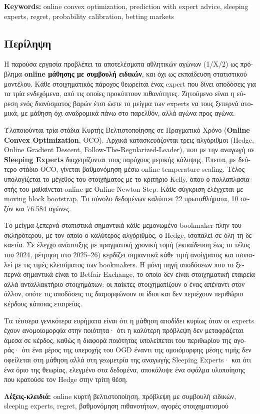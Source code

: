 \documentclass[12pt,a4paper,oneside]{report}
\renewcommand{\_}{\oldunderscore\allowbreak}
\theoremstyle{definition}
\theoremstyle{plain}
\theoremstyle{definition}   %
\begin{document}
\vspace{1em}
\noindent\textbf{Keywords:} online convex optimization, prediction with expert advice,
sleeping experts, regret, probability calibration, betting markets

\cleardoublepage

\begin{greek}
\chapter*{Περίληψη}

Η παρούσα εργασία προβλέπει τα αποτελέσματα αθλητικών αγώνων (1/Χ/2) ως πρόβλημα
\textbf{online μάθησης με συμβουλή ειδικών}, και όχι ως εκπαίδευση στατιστικού μοντέλου.
Κάθε στοιχηματικός πάροχος θεωρείται ένας expert που δίνει αποδόσεις για τα τρία ενδεχόμενα,
από τις οποίες προκύπτουν πιθανότητες. Ζητούμενο είναι η εύρεση ενός διανύσματος βαρών έτσι
ώστε το μείγμα των experts να τους ξεπερνά ατομικά, με μάθηση όχι αναδρομικά πάνω στο
παρελθόν, αλλά αγώνα προς αγώνα.

Υλοποιούνται τρία στάδια Κυρτής Βελτιστοποίησης σε Πραγματικό Χρόνο (\textbf{Online Convex
Optimization}, OCO). Αρχικά κατασκευάζονται τρεις αλγόριθμοι (Hedge, Online Gradient Descent,
Follow-The-Regularized-Leader), που με την αναγωγή σε \textbf{Sleeping Experts} διαχειρίζονται
τους παρόχους μερικής κάλυψης. Έπειτα, με δεύτερο στάδιο OCO, γίνεται βαθμονόμηση μέσω online
temperature scaling. Τέλος υπολογίζεται το μέγεθος του στοιχήματος με το κριτήριο Kelly, όπου
ο πολλαπλασιαστής του μαθαίνεται online με Online Newton Step. Κάθε σύγκριση ελέγχεται με
moving block bootstrap. Το σύνολο δεδομένων καλύπτει 22 πρωταθλήματα, 10 σεζόν και 76.584
αγώνες.

Το μείγμα ξεπερνά στατιστικά σημαντικά κάθε μεμονωμένο bookmaker πλην του σκληρότερου, με
τον οποίο ο καλύτερος αλγόριθμος, ο Hedge, ισοπαλεί σε όλη τη δεκαετία. Σε έλεγχο ανάπτυξης με πραγματική
χρονική τομή (εκπαίδευση έως το τέλος του 2024, μέτρηση στο 2025--26) κερδίζει σημαντικά κάθε
τιμή ανοίγματος και ισοπαλεί με τις τιμές κλεισίματος των bookmakers. Η μόνη πηγή
αποδόσεων που το ξεπερνά σημαντικά είναι το Betfair Exchange, το οποίο δεν είναι στοιχηματική
εταιρεία αλλά ανταλλακτήριο στοιχημάτων: οι παίκτες στοιχηματίζουν ο ένας απέναντι στον άλλον,
οπότε τις αποδόσεις τις διαμορφώνουν οι ίδιοι και δεν περιέχουν περιθώριο κέρδους κάποιας
εταιρείας.

Τα τέσσερα γενικότερα ευρήματα είναι ότι η μάθηση αποδίδει κυρίως όταν οι experts έχουν
ανομοιομορφία στην ποιότητα· ότι η καλύτερη πρόβλεψη δεν μεταφράζεται άμεσα σε κέρδος, καθώς
η διαφορά ποιότητας υπολείπεται του περιθωρίου της αγοράς· ότι ένα μέρος της υπεροχής του OGD
έναντι της ομοιόμορφης μέσης τιμής δεν οφείλεται στη μάθηση αλλά στη γεωμετρία της αναγωγής
Sleeping Experts· και ότι ένα όριο της θεωρίας, ελεγμένο στα δεδομένα, αποκάλυψε ένα σφάλμα
υλοποίησης που κρατούσε τον Hedge στην τρίτη θέση.

\vspace{1em}
\noindent\textbf{Λέξεις-κλειδιά:} online κυρτή βελτιστοποίηση, πρόβλεψη με συμβουλή ειδικών,
sleeping experts, regret, βαθμονόμηση πιθανοτήτων, αγορές στοιχηματισμού
\end{greek}
\end{document}
